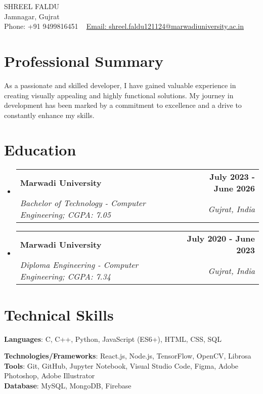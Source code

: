 \documentclass[letterpaper,11pt]{article}
\makeatletter
\newcommand{\resumeSubheading}[4]{
  \vspace{-2pt}\item
	\begin{tabular*}{1.0\textwidth}[t]{l@{\extracolsep{\fill}}r}
  	\textbf{#1} & \textbf{\small #2} \\
  	\textit{\small#3} & \textit{\small #4} \\
	\end{tabular*}\vspace{-7pt}
}
\newcommand{\resumeSubHeadingListStart}{\begin{itemize}[leftmargin=0.0in, label={}]}
\newcommand{\resumeSubHeadingListEnd}{\end{itemize}}
\makeatother
\begin{document}

\begin{center}
	{\Huge \scshape SHREEL FALDU} \\ \vspace{1pt}
	Jamnagar, Gujrat \\ \vspace{1pt}
	\small \raisebox{-0.1\height}Phone: +91 9499816451 ~ \href{shreel.faldu121124@marwadiuniversity.ac.in}{\raisebox{-0.2\height}Email: {shreel.faldu121124@marwadiuniversity.ac.in}} ~
	\vspace{-8pt}
\end{center}

\section{Professional Summary}
    \resumeSubHeadingListStart
  	{As a passionate and skilled developer, I have gained valuable experience in creating visually appealing and highly functional solutions. My journey in development has been marked by a commitment to excellence and a drive to constantly enhance my skills.}
  \resumeSubHeadingListEnd


\section{Education}
\resumeSubHeadingListStart
	\resumeSubheading
  	{Marwadi University}{July 2023 - June 2026}
  	{Bachelor of Technology - Computer Engineering; CGPA: 7.05}{Gujrat, India}
  \resumeSubHeadingListEnd
  \vspace{-15pt}
  \resumeSubHeadingListStart
	\resumeSubheading
  	{Marwadi University}{July 2020 - June 2023}
  	{Diploma Engineering - Computer Engineering;  CGPA: 7.34}{Gujrat, India}
  \resumeSubHeadingListEnd
  
  

  
\section{Technical Skills}
 \begin{itemize}[leftmargin=0.15in, label={}]
	\small{\item{
 	\textbf{Languages}{: C, C++, Python, JavaScript (ES6+), HTML, CSS, SQL  } \\  \vspace{3pt}

 	\textbf{Technologies/Frameworks}{: React.js,  Node.js, TensorFlow, OpenCV, Librosa } \\ \vspace{3pt}
        \textbf{Tools}{: Git, GitHub, Jupyter Notebook, Visual Studio Code, Figma, Adobe Photoshop, Adobe Illustrator  }\\ \vspace{3pt}
        \textbf{Database}{: MySQL, MongoDB, Firebase  }
	}}
 \end{itemize}
\end{document}
